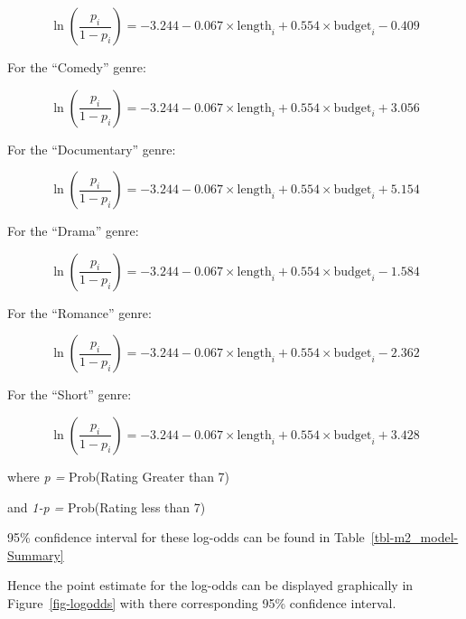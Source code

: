 \documentclass[
  letterpaper,
  DIV=11,
  numbers=noendperiod]{scrartcl}
\begin{document}
\[\ln\left(\frac{p_i}{1-p_i}\right) = -3.244 - 0.067 \times \textrm{length}_i + 0.554 \times \textrm{budget}_i - 0.409\]

For the ``Comedy'' genre:

\[\ln\left(\frac{p_i}{1-p_i}\right) = -3.244 - 0.067 \times \textrm{length}_i + 0.554 \times \textrm{budget}_i + 3.056\]

For the ``Documentary'' genre:

\[\ln\left(\frac{p_i}{1-p_i}\right) = -3.244 - 0.067 \times \textrm{length}_i + 0.554 \times \textrm{budget}_i + 5.154\]

For the ``Drama'' genre:

\[\ln\left(\frac{p_i}{1-p_i}\right) = -3.244 - 0.067 \times \textrm{length}_i + 0.554 \times \textrm{budget}_i - 1.584\]

For the ``Romance'' genre:

\[\ln\left(\frac{p_i}{1-p_i}\right) = -3.244 - 0.067 \times \textrm{length}_i + 0.554 \times \textrm{budget}_i - 2.362\]

For the ``Short'' genre:

\[\ln\left(\frac{p_i}{1-p_i}\right) = -3.244 - 0.067 \times \textrm{length}_i + 0.554 \times \textrm{budget}_i + 3.428\]

where \emph{p =} Prob(Rating Greater than 7)

and \emph{1-p =} Prob(Rating less than 7)

95\% confidence interval for these log-odds can be found in
Table~\ref{tbl-m2_model-Summary}

Hence the point estimate for the log-odds can be displayed graphically
in Figure~\ref{fig-logodds} with there corresponding 95\% confidence
interval.
\end{document}
